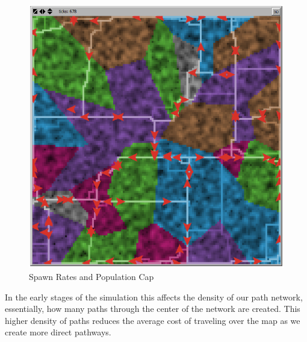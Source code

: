 \documentclass[conference]{IEEEtran}
\begin{document}
\begin{figure}[h]
\begin{center}
\includegraphics[scale=0.4]{image/results4}
\end{center}
\caption{Spawn Rates and Population Cap}
\end{figure}
	
	In the early stages of the simulation this affects the density of our path network, essentially, how many paths through the center of the network are created. This higher density of paths reduces the average cost of traveling over the map as we create more direct pathways.
	
\end{document}

